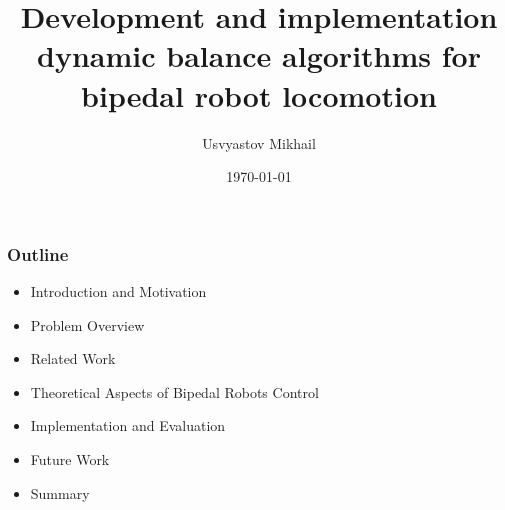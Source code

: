 \documentclass{beamer}
\title[\hbox to 56mm{Bipedal robot locomotion control\hfill\insertframenumber\,/\,\inserttotalframenumber}]
            {Development and implementation dynamic balance algorithms for bipedal robot locomotion}
\author{Usvyastov Mikhail}
\institute[Innopolis]{Innopolis University\\
    Final presentation\\
    Supervisor: Evgeni Magid
}
\date{\normalsize \today}
\begin{document}
	\begin{frame}
	  \titlepage
	\end{frame}


	\begin{frame}
		\frametitle{Outline}
		\begin{itemize}
			\item Introduction and Motivation
			\item Problem Overview
			\item Related Work
			\item Theoretical Aspects of Bipedal Robots Control
			\item Implementation and Evaluation
			\item Future Work
			\item Summary
		\end{itemize}
	\end{frame}

\end{document}
